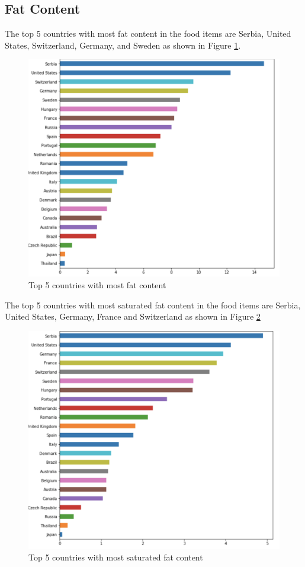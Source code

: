 \documentclass[sigconf]{acmart}
\begin{document}
\subsection{Fat Content}
The top 5 countries with most fat content in the food items are Serbia, United States, Switzerland, Germany, and Sweden as shown in Figure \ref{fig:Fig8}.
	
\begin{figure}
\includegraphics[width=1.0\columnwidth]{images/fig8.png}
\caption{Top 5 countries with most fat content \cite{code-base}}
\label{fig:Fig8}
\end{figure}

The top 5 countries with most saturated fat content in the food items are Serbia, United States, Germany, France and Switzerland as shown in Figure \ref{fig:Fig9}
	
\begin{figure}
\includegraphics[width=1.0\columnwidth]{images/fig9.png}
\caption{Top 5 countries with most saturated fat content \cite{code-base}}
\label{fig:Fig9}
\end{figure}
\end{document}

